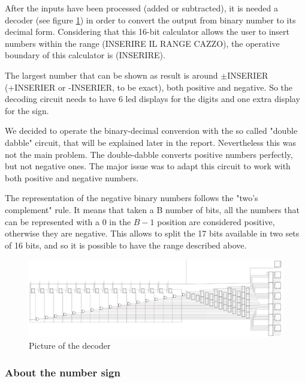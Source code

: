 \documentclass{article}
\begin{document}
After the inputs have been processed (added or subtracted), it is needed a decoder (see figure \ref{Decoder}) in order to convert the output from binary number to its decimal form. Considering that this 16-bit calculator allows the user to insert numbers within the range (INSERIRE IL RANGE CAZZO), the operative boundary of this calculator is (INSERIRE).

\vspace{3mm}

The largest number that can be shown as result is around $\pm$INSERIER (+INSERIER or -INSERIER, to be exact), both positive and negative. So the decoding circuit needs to have 6 led displays for the digits and one extra display for the sign.

\vspace{3mm}

We decided to operate the binary-decimal conversion with the so called "double dabble" circuit, that will be explained later in the report. Nevertheless this was not the main problem. The double-dabble converts positive numbers perfectly, but not negative ones. The major issue was to adapt this circuit to work with both positive and negative numbers. 

The representation of the negative binary numbers follows the "two's complement" rule. It means that taken a B number of bits, all the numbers that can be represented with a 0 in the $B-1$ position are considered positive, otherwise they are negative. This allows to split the 17 bits available in two sets of 16 bits, and so it is possible to have the range described above.

\begin{figure}[h]
    \centering
    \includegraphics[scale=0.42]{SC_Decoder}
    \caption{Picture of the decoder}
    \label{Decoder}
  \end{figure}

\subsubsection{About the number sign}
\end{document}
